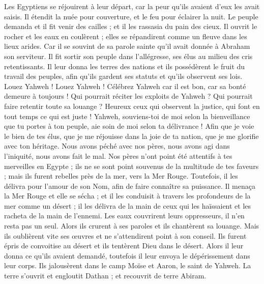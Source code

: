 \begin{multicols}{2}
Les Egyptiens se réjouirent à leur départ, car la peur qu'ils avaient d'eux les avait saisis.
Il étendit la nuée pour couverture, et le feu pour éclairer la nuit.
Le peuple demanda et il fit venir des cailles ; et il les rassasia du pain des cieux.
Il ouvrit le rocher et les eaux en coulèrent ; elles se répandirent comme un fleuve dans les lieux arides.
Car il se souvint de sa parole sainte qu'il avait donnée à Abraham son serviteur.
Il fit sortir son peuple dans l'allégresse, ses élus au milieu des cris retentissants.
Il leur donna les terres des nations et ils possédèrent le fruit du travail des peuples,
afin qu'ils gardent ses statuts et qu'ils observent ses lois. Louez Yahweh !
\VerseOne{}Louez Yahweh ! Célébrez Yahweh car il est bon, car sa bonté demeure à toujours !
Qui pourrait réciter les exploits de Yahweh ? Qui pourrait faire retentir toute sa louange ?
Heureux ceux qui observent la justice, qui font en tout temps ce qui est juste !
Yahweh, souviens-toi de moi selon la bienveillance que tu portes à ton peuple, aie soin de moi selon ta délivrance !
Afin que je voie le bien de tes élus, que je me réjouisse dans la joie de ta nation, que je me glorifie avec ton héritage.
Nous avons péché avec nos pères, nous avons agi dans l'iniquité, nous avons fait le mal.
Nos pères n'ont point été attentifs à tes merveilles en Egypte ; ils ne se sont point souvenus de la multitude de tes faveurs ; mais ils furent rebelles près de la mer, vers la Mer Rouge.
Toutefois, il les délivra pour l'amour de son Nom, afin de faire connaître sa puissance.
Il menaça la Mer Rouge et elle se sécha ; et il les conduisit à travers les profondeurs de la mer comme un désert ;
il les délivra de la main de ceux qui les haïssaient et les racheta de la main de l'ennemi.
Les eaux couvrirent leurs oppresseurs, il n'en resta pas un seul.
Alors ils crurent à ses paroles et ils chantèrent sa louange.
Mais ils oublièrent vite ses œuvres et ne s'attendirent point à son conseil.
Ils furent épris de convoitise au désert et ils tentèrent Dieu dans le désert.
Alors il leur donna ce qu'ils avaient demandé, toutefois il leur envoya le dépérissement dans leur corps.
Ils jalousèrent dans le camp Moïse et Aaron, le saint de Yahweh.
La terre s'ouvrit et engloutit Dathan ; et recouvrit de terre Abiram.

\end{multicols}
